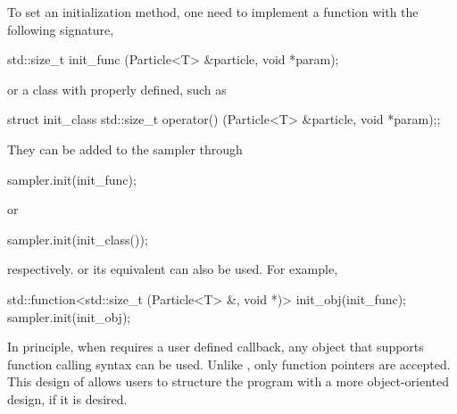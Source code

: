 \documentclass[11pt, bib, hyper, mint, minted=cache]{marticle}
\begin{document}
To set an initialization method, one need to implement a function with the
following signature,
\begin{cppcode}
std::size_t init_func (Particle<T> &particle, void *param);
\end{cppcode}
or a class with  properly defined, such as
\begin{cppcode}
struct init_class
{std::size_t operator() (Particle<T> &particle, void *param);};
\end{cppcode}
They can be added to the sampler through
\begin{cppcode}
sampler.init(init_func);
\end{cppcode}
or
\begin{cppcode}
sampler.init(init_class());
\end{cppcode}
respectively. \cppoo {} or its \lboost equivalent
 can also be used. For example,
\begin{cppcode}
std::function<std::size_t (Particle<T> &, void *)> init_obj(init_func);
sampler.init(init_obj);
\end{cppcode}
In principle, when \vsmc requires a user defined callback, any object that
supports function calling syntax can be used. Unlike \lsmctc, only function
pointers are accepted. This design of \vsmc allows users to structure the
program with a more object-oriented design, if it is desired.
\end{document}
